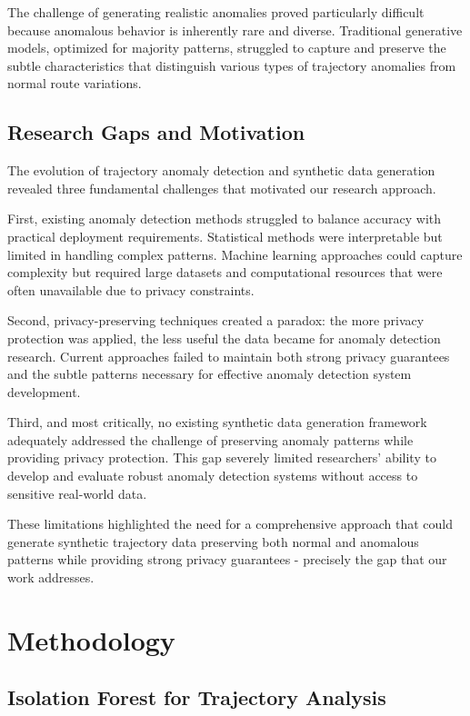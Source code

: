 \documentclass[runningheads]{llncs}
\begin{document}
The challenge of generating realistic anomalies proved particularly difficult because anomalous behavior is inherently rare and diverse. Traditional generative models, optimized for majority patterns, struggled to capture and preserve the subtle characteristics that distinguish various types of trajectory anomalies from normal route variations.

\subsection{Research Gaps and Motivation}
\label{sec:gaps}

The evolution of trajectory anomaly detection and synthetic data generation revealed three fundamental challenges that motivated our research approach.

First, existing anomaly detection methods struggled to balance accuracy with practical deployment requirements. Statistical methods were interpretable but limited in handling complex patterns. Machine learning approaches could capture complexity but required large datasets and computational resources that were often unavailable due to privacy constraints.

Second, privacy-preserving techniques created a paradox: the more privacy protection was applied, the less useful the data became for anomaly detection research. Current approaches failed to maintain both strong privacy guarantees and the subtle patterns necessary for effective anomaly detection system development.

Third, and most critically, no existing synthetic data generation framework adequately addressed the challenge of preserving anomaly patterns while providing privacy protection. This gap severely limited researchers' ability to develop and evaluate robust anomaly detection systems without access to sensitive real-world data.

These limitations highlighted the need for a comprehensive approach that could generate synthetic trajectory data preserving both normal and anomalous patterns while providing strong privacy guarantees - precisely the gap that our work addresses.

\section{Methodology}
\label{sec:methodology}

\subsection{Isolation Forest for Trajectory Analysis}
\label{sec:iso}
\end{document}
